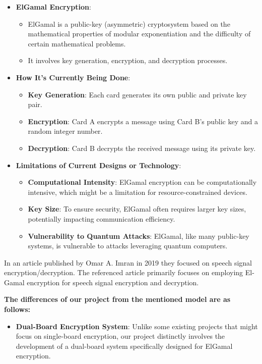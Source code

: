 \documentclass[12pt]{article}
\begin{document}
	\begin{itemize}
		\item \textbf{ElGamal Encryption}:
		\begin{itemize}
			\item ElGamal is a public-key (asymmetric) cryptosystem based on the mathematical properties of modular exponentiation and the difficulty of certain mathematical problems\cite{book}.
			\item It involves key generation, encryption, and decryption processes.
		\end{itemize}
		
		\item \textbf{How It's Currently Being Done}:
		\begin{itemize}
			\item \textbf{Key Generation}: Each card generates its own public and private key pair.
			\item \textbf{Encryption}: Card A encrypts a message using Card B's public key and a random integer number.
			\item \textbf{Decryption}: Card B decrypts the received message using its private key.
		\end{itemize}
		
		\item \textbf{Limitations of Current Designs or Technology}:
		\begin{itemize}
			\item \textbf{Computational Intensity}: ElGamal encryption can be computationally intensive, which might be a limitation for resource-constrained devices.
			\item \textbf{Key Size}: To ensure security, ElGamal often requires larger key sizes, potentially impacting communication efficiency.
			\item \textbf{Vulnerability to Quantum Attacks}: ElGamal, like many public-key systems, is vulnerable to attacks leveraging quantum computers.
		\end{itemize}
	\end{itemize}
		
		
		In an article published by Omar A. Imran in 2019\cite{IMRAN20201028} they focused on speech signal encryption/decryption.	The referenced article primarily focuses on employing El-Gamal encryption for speech signal encryption and decryption. 
		 
	 \textbf{The differences of our project from the mentioned model are as follows:}
	 \begin{itemize}
	 	\item \textbf{Dual-Board Encryption System}: Unlike some existing projects that might focus on single-board encryption, our project distinctly involves the development of a dual-board system specifically designed for ElGamal encryption.
	 \end{itemize}
	 
\end{document}
